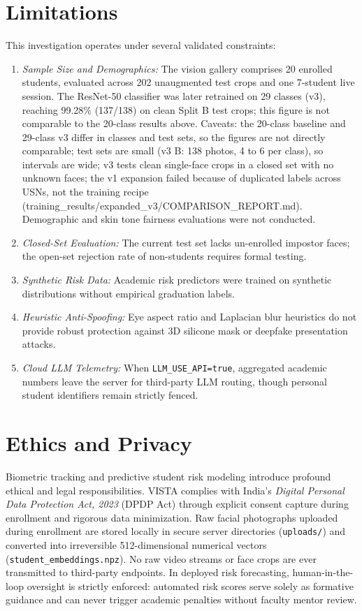 \documentclass[conference]{IEEEtran}
\begin{document}
\section{Limitations}
This investigation operates under several validated constraints:
\begin{enumerate}
    \item \textit{Sample Size and Demographics:} The vision gallery comprises 20 enrolled students, evaluated across 202 unaugmented test crops and one 7-student live session. The ResNet-50 classifier was later retrained on 29 classes (v3), reaching 99.28\% (137/138) on clean Split B test crops; this figure is not comparable to the 20-class results above. Caveats: the 20-class baseline and 29-class v3 differ in classes and test sets, so the figures are not directly comparable; test sets are small (v3 B: 138 photos, 4 to 6 per class), so intervals are wide; v3 tests clean single-face crops in a closed set with no unknown faces; the v1 expansion failed because of duplicated labels across USNs, not the training recipe (training_results/expanded_v3/COMPARISON_REPORT.md). Demographic and skin tone fairness evaluations were not conducted.
    \item \textit{Closed-Set Evaluation:} The current test set lacks un-enrolled impostor faces; the open-set rejection rate of non-students requires formal testing.
    \item \textit{Synthetic Risk Data:} Academic risk predictors were trained on synthetic distributions without empirical graduation labels.
    \item \textit{Heuristic Anti-Spoofing:} Eye aspect ratio and Laplacian blur heuristics do not provide robust protection against 3D silicone mask or deepfake presentation attacks.
    \item \textit{Cloud LLM Telemetry:} When \texttt{LLM\_USE\_API=true}, aggregated academic numbers leave the server for third-party LLM routing, though personal student identifiers remain strictly fenced.
\end{enumerate}

\section{Ethics and Privacy}
Biometric tracking and predictive student risk modeling introduce profound ethical and legal responsibilities. VISTA complies with India's \textit{Digital Personal Data Protection Act, 2023} (DPDP Act) \cite{dpdpact2023} through explicit consent capture during enrollment and rigorous data minimization. Raw facial photographs uploaded during enrollment are stored locally in secure server directories (\texttt{uploads/}) and converted into irreversible 512-dimensional numerical vectors (\texttt{student\_embeddings.npz}). No raw video streams or face crops are ever transmitted to third-party endpoints. In deployed risk forecasting, human-in-the-loop oversight is strictly enforced: automated risk scores serve solely as formative guidance and can never trigger academic penalties without faculty mentor review.
\end{document}
